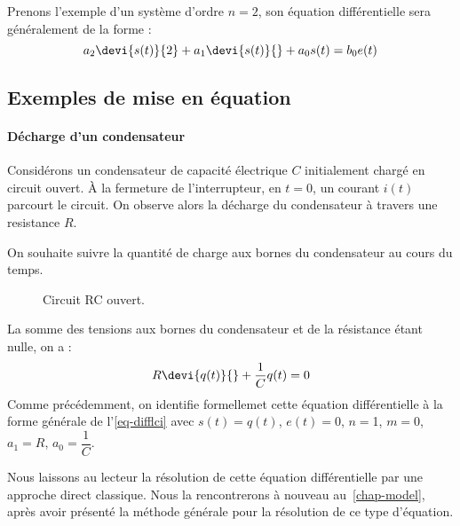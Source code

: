 Prenons l'exemple d'un système d'ordre $n=2$, son équation différentielle 
sera généralement de la forme :
$$
a_2\devi{s(t)}{2}+a_1\devi{s(t)}{}+a_0 s(t)=b_0e(t)
$$

\subsection{Exemples de mise en équation}

\paragraph{Décharge d'un condensateur}

Considérons un condensateur de capacité électrique $C$ 
initialement chargé en circuit ouvert.
À la fermeture de l'interrupteur, en $t=0$, 
un courant $i(t)$ parcourt le circuit.
On observe alors la décharge du condensateur à travers une resistance $R$. 

On souhaite suivre la quantité de charge aux bornes du condensateur au 
cours du temps.
\begin{figure}[!h]      
    \centering
    
    \caption{Circuit RC ouvert.\label{fig-decharge_condensateur}}
\end{figure}

La somme des tensions aux bornes du condensateur et de la résistance 
étant nulle, on a :
\begin{align*}
    R\devi{q(t)}{}+\dfrac{1}{C}q(t)=0 
\end{align*}
Comme précédemment, on identifie formellemet cette équation différentielle 
à la forme générale de l'\cref{eq-difflci} avec $s(t)=q(t)$, $e(t)=0$, 
$n=$1, $m=0$, $a_1=R$, $a_0=\dfrac{1}{C}$.

Nous laissons au lecteur la résolution de cette équation différentielle 
par une approche direct classique.
Nous la rencontrerons à nouveau au~\cref{chap-model}, après avoir 
présenté la méthode générale pour la résolution de ce type d'équation.

